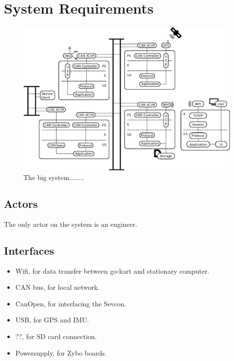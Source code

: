\section{System Requirements} %
\label{sec:system_requirements}


\begin{figure}[!h]
	\centering
	\includegraphics[angle=90,width=\textwidth]{graphics/analysis_complex.eps}
	\caption{The big system........}
	\label{fig:complete_system}
\end{figure}



\subsection{Actors}
The only actor on the system is an engineer.

\subsection{Interfaces}
\begin{itemize}
\item Wifi, for data transfer between go-kart and stationary computer.
\item CAN bus, for local network.
\item CanOpen, for interfacing the Sevcon.
\item USB, for GPS and IMU.
\item ??, for SD card connection.
\item Powersupply, for Zybo boards.
\end{itemize}

